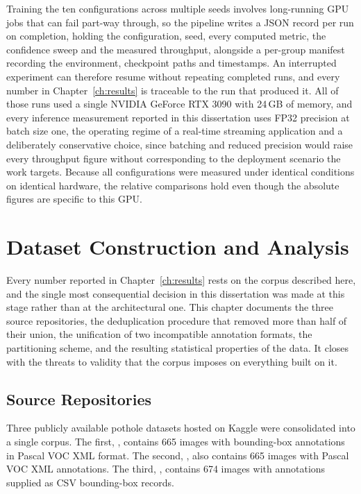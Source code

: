 \documentclass[MScCS]{uccthesis}
\begin{document}
Training the ten configurations across multiple seeds involves long-running GPU
jobs that can fail part-way through, so the pipeline writes a JSON record per
run on completion, holding the configuration, seed, every computed metric, the
confidence sweep and the measured throughput, alongside a per-group manifest
recording the environment, checkpoint paths and timestamps. An interrupted
experiment can therefore resume without repeating completed runs, and every
number in Chapter~\ref{ch:results} is traceable to the run that produced it.
All of those runs used a single NVIDIA GeForce RTX 3090 with 24\,GB of memory,
and every inference measurement reported in this dissertation uses FP32
precision at batch size one, the operating regime of a real-time streaming
application and a deliberately conservative choice, since batching and reduced
precision would raise every throughput figure without corresponding to the
deployment scenario the work targets. Because all configurations were measured
under identical conditions on identical hardware, the relative comparisons hold
even though the absolute figures are specific to this GPU.



\chapter{Dataset Construction and Analysis}
\label{ch:dataset}

Every number reported in Chapter~\ref{ch:results} rests on the corpus described
here, and the single most consequential decision in this dissertation was made
at this stage rather than at the architectural one. This chapter documents the
three source repositories, the deduplication procedure that removed more than
half of their union, the unification of two incompatible annotation formats,
the partitioning scheme, and the resulting statistical properties of the data.
It closes with the threats to validity that the corpus imposes on everything
built on it.

\section{Source Repositories}
\label{sec:sources}

Three publicly available pothole datasets hosted on Kaggle were consolidated
into a single corpus. The first, 
\parencite{chitholian_dataset}, contains 665 images with bounding-box
annotations in Pascal VOC XML format. The second,
 \parencite{andrewmvd_dataset}, also
contains 665 images with Pascal VOC XML annotations. The third,
 \parencite{ashishkumarak_dataset},
contains 674 images with annotations supplied as CSV bounding-box records.
\end{document}
